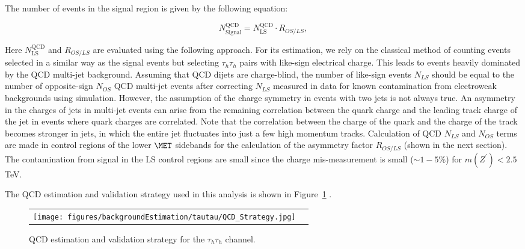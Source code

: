 The number of events in the signal region is given by the following equation: 

\begin{equation}                                                                                                                                                      
N_{\textrm{Signal}}^{\textrm{QCD}} = N_{\textrm{LS}}^{\textrm{QCD}} \cdot R_{OS/LS},
\end{equation}
   
Here $N_{\textrm{LS}}^{\textrm{QCD}}$ and $R_{OS/LS}$ are evaluated using the following approach. For its estimation, we rely on the classical method of counting events selected in a similar way as the signal events but selecting $\tau_{h}\tau_{h}$ pairs with like-sign electrical charge. This leads to events heavily dominated by the QCD multi-jet background. Assuming that QCD dijets are charge-blind, the number of like-sign events $N_{LS}$ should be equal to the number of opposite-sign $N_{OS}$ QCD multi-jet events after correcting $N_{LS}$ measured in data for known contamination from electroweak backgrounds using simulation. However, the assumption of the charge symmetry in events with two jets is not always true. An asymmetry in the charges of jets in multi-jet events can arise from the remaining correlation between the quark charge and the leading track charge of the jet in events where quark charges are correlated. 
Note that the correlation between the charge of the quark and the charge of the track becomes stronger in jets, in which the entire jet fluctuates into just a few high momentum tracks. Calculation of QCD $N_{LS}$ and $N_{OS}$ terms are made in control regions of the lower $\MET$ sidebands for the calculation of the asymmetry factor $R_{OS/LS}$ (shown in the next section). The contamination from signal in the LS control regions are small since the charge mis-measurement is small ($\sim 1-5\%$) for $m(Z^{\prime}) < 2.5$ TeV. 

The QCD estimation and validation strategy used in this analysis is shown in Figure~\ref{fig:qcd} .    


 \begin{figure}[tbh!]
     \centering
     \begin{tabular}{cc}
       \texttt{[image: figures/backgroundEstimation/tautau/QCD\_Strategy.jpg]}
     \end{tabular}
     \caption{QCD estimation and validation strategy for the $\tau_{h}\tau_{h}$ channel.}
    \label{fig:qcd}
   \end{figure}

